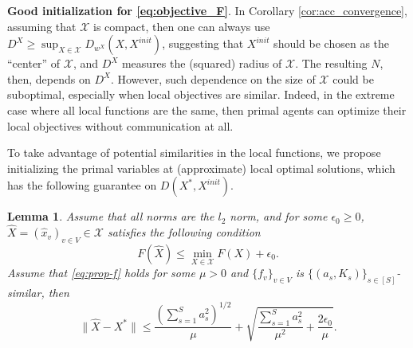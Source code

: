 \documentclass[10pt]{article}
\newcommand{\mc}{\mathcal}
\newtheorem{lemma}{Lemma}[section]
\begin{document}
\textbf{Good initialization for \eqref{eq:objective_F}}. 
In Corollary \ref{cor:acc_convergence}, assuming that $\mc X$ is compact, then one can always use $D^X \geq \sup_{X\in {\mc X}} D_{w^X}(X,X^{init})$, suggesting that $X^{init}$ should be chosen as the ``center'' of ${\mc X}$, and $D^X$ measures the (squared) radius of ${\mc X}$. The resulting $N$, then, depends on $D^X$. However, such dependence on the size of ${\mc X}$ could be suboptimal, especially when local objectives are similar. Indeed, in the extreme case where all local functions are the same, then primal agents can optimize their local objectives without communication at all.

To take advantage of potential similarities in the local functions, we propose initializing the primal variables at (approximate) local optimal solutions, which has the following guarantee on $D(X^*,X^{init})$.
\begin{lemma}\label{lm:good_init}
   Assume that all norms are the $l_2$ norm, and for some $\epsilon_0\geq 0$, $\widehat{X} = (\widehat{x}_v)_{v\in V} \in {\mc X}$ satisfies the following condition
      \begin{displaymath}
       F(\widehat{X}) \leq \min_{X\in {\mc X}} F(X) + \epsilon_0.
   \end{displaymath}
   Assume that \eqref{eq:prop-f} holds for some $\mu>0$ and $\{f_v\}_{v\in V}$ is $\{(a_s,K_s)\}_{s\in [S]}$-similar, then 
   \begin{displaymath}
    \|\widehat{X} - X^*\| \leq \frac{(\sum_{s=1}^S a_s^2)^{1/2}}{\mu} + \sqrt{\frac{\sum_{s=1}^S a_s^2}{\mu^2} + \frac{2\epsilon_0}{\mu}}.
\end{displaymath}
\end{lemma}
\end{document}
